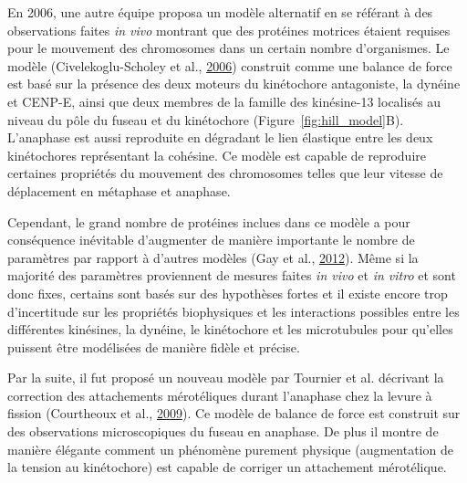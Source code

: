 \documentclass[12pt,a4paper,twoside,openright]{book}
\begin{document}
En 2006, une autre équipe proposa un modèle alternatif en se référant à
des observations faites \emph{in vivo} montrant que des protéines
motrices étaient requises pour le mouvement des chromosomes dans un
certain nombre d'organismes. Le modèle (Civelekoglu-Scholey et al.,
\protect\hyperlink{ref-Civelekoglu-Scholey2006}{2006}) construit comme
une balance de force est basé sur la présence des deux moteurs du
kinétochore antagoniste, la dynéine et CENP-E, ainsi que deux membres de
la famille des kinésine-13 localisés au niveau du pôle du fuseau et du
kinétochore (Figure~\ref{fig:hill_model}B). L'anaphase est aussi
reproduite en dégradant le lien élastique entre les deux kinétochores
représentant la cohésine. Ce modèle est capable de reproduire certaines
propriétés du mouvement des chromosomes telles que leur vitesse de
déplacement en métaphase et anaphase.

Cependant, le grand nombre de protéines inclues dans ce modèle a pour
conséquence inévitable d'augmenter de manière importante le nombre de
paramètres par rapport à d'autres modèles (Gay et al.,
\protect\hyperlink{ref-Gay2012a}{2012}). Même si la majorité des
paramètres proviennent de mesures faites \emph{in vivo} et \emph{in
vitro} et sont donc fixes, certains sont basés sur des hypothèses fortes
et il existe encore trop d'incertitude sur les propriétés biophysiques
et les interactions possibles entre les différentes kinésines, la
dynéine, le kinétochore et les microtubules pour qu'elles puissent être
modélisées de manière fidèle et précise.

Par la suite, il fut proposé un nouveau modèle par Tournier et al.
décrivant la correction des attachements mérotéliques durant l'anaphase
chez la levure à fission (Courtheoux et al.,
\protect\hyperlink{ref-Courtheoux2009}{2009}). Ce modèle de balance de
force est construit sur des observations microscopiques du fuseau en
anaphase. De plus il montre de manière élégante comment un phénomène
purement physique (augmentation de la tension au kinétochore) est
capable de corriger un attachement mérotélique.
\end{document}

